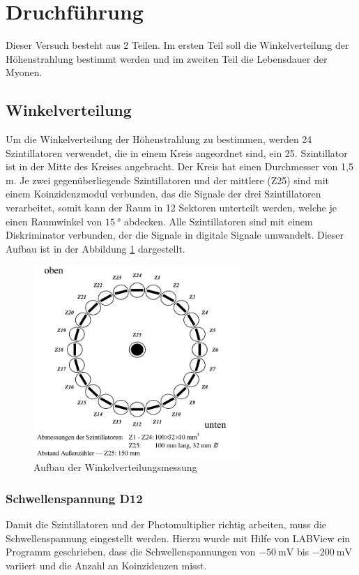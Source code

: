 \documentclass{article}
\begin{document}
\section{Druchführung}
Dieser Versuch besteht aus 2 Teilen. Im ersten Teil soll die Winkelverteilung der Höhenstrahlung bestimmt werden und im zweiten Teil die Lebensdauer der Myonen.

\subsection{Winkelverteilung}
Um die Winkelverteilung der Höhenstrahlung zu bestimmen, werden 24 Szintillatoren verwendet, die in einem Kreis angeordnet sind, ein 25. Szintillator ist in der Mitte des Kreises angebracht.
Der Kreis hat einen Durchmesser von 1,5 m.
Je zwei gegenüberliegende Szintillatoren und der mittlere (Z25) sind mit einem Koinzidenzmodul verbunden, das die Signale der drei Szintillatoren verarbeitet, somit kann der Raum in 12 Sektoren unterteilt werden, 
welche je einen Raumwinkel von $\SI{15}{\degree}$ abdecken.
Alle Szintillatoren sind mit einem Diskriminator verbunden, der die Signale in digitale Signale umwandelt.
Dieser Aufbau ist in der Abbildung \ref{fig:AufbauWinkelverteilung} dargestellt.
\begin{figure}[H]
    \centering
    \includegraphics[width=0.7\textwidth]{figures/Aufbau_Winkelverteilung.png}
    \caption{Aufbau der Winkelverteilungsmessung\cite{Anleitung}}
    \label{fig:AufbauWinkelverteilung}
\end{figure}


\subsubsection*{Schwellenspannung D12}
Damit die Szintillatoren und der Photomultiplier richtig arbeiten, muss die Schwellenspannung eingestellt werden.
Hierzu wurde mit Hilfe von LABView ein Programm geschrieben, dass die Schwellenspannungen von $\SI{-50}{\milli\volt}$ bis $\SI{-200}{\milli\volt}$ variiert und die Anzahl an Koinzidenzen misst.
\end{document}
